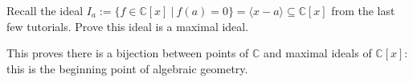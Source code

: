 \documentclass[11pt,twoside, a4paper]{report}
\theoremstyle{plain}
\theoremstyle{definition}
\begin{document}
Recall the ideal $I_{a}:=\{ f \in \mathbb{C}[x] \ | \ f(a) = 0 \} = \langle x-a \rangle \subseteq \mathbb{C}[x]$ from the last few tutorials. Prove this ideal is a maximal ideal. 

This proves there is a bijection between points of $\mathbb{C}$ and maximal ideals of $\mathbb{C}[x]$: this is the beginning point of algebraic geometry. 





\end{document}
